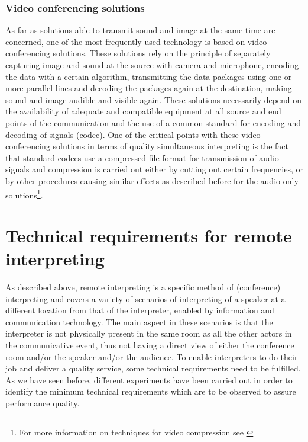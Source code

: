 \documentclass[output=paper]{langsci/langscibook}
\begin{document}
\subsubsection{Video conferencing solutions}
\label{sub:ziegler:4.4}
As far as solutions able to transmit sound and image at the same time are concerned, one of the most frequently used technology is based on video conferencing solutions. These solutions rely on the principle of separately capturing image and sound at the source with camera and microphone, encoding the data with a certain algorithm, transmitting the data packages using one or more parallel lines and decoding the packages again at the destination, making sound and image audible and visible again. These solutions necessarily depend on the availability of adequate and compatible equipment at all source and end points of the communication and the use of a common standard for encoding and decoding of signals (codec). One of the critical points with these video conferencing solutions in terms of quality simultaneous interpreting is the fact that standard codecs use a compressed file format for transmission of audio signals and compression is carried out either by cutting out certain frequencies, or by other procedures causing similar effects as described before for the audio only solutions\footnote{For more information on techniques for video compression see \citet{Wiegand2003}}.

\section{Technical requirements for remote interpreting}
\label{sec:ziegler:5}
As described above, remote interpreting is a specific method of (conference) interpreting and covers a variety of scenarios of interpreting of a speaker at a different location from that of the interpreter, enabled by information and communication technology. The main aspect in these scenarios is that the interpreter is not physically present in the same room as all the other actors in the communicative event, thus not having a direct view of either the conference room and/or the speaker and/or the audience. To enable interpreters to do their job and deliver a quality service, some technical requirements need to be fulfilled. As we have seen before, different experiments have been carried out in order to identify the minimum technical requirements which are to be observed to assure performance quality.
\end{document}
